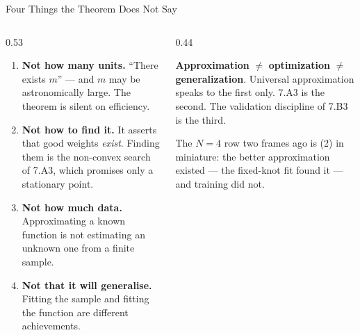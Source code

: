 \begin{frame}{Four Things the Theorem Does Not Say}
\begin{columns}[T]
\begin{column}{0.53\textwidth}
\small
\begin{enumerate}\small\setlength{\itemsep}{1.4mm}
  \item \textbf{Not how many units.} ``There exists $m$'' --- and $m$ may be astronomically large. The theorem is silent on efficiency.
  \item \textbf{Not how to find it.} It asserts that good weights \emph{exist}. Finding them is the non-convex search of 7.A3, which promises only a stationary point.
  \item \textbf{Not how much data.} Approximating a known function is not estimating an unknown one from a finite sample.
  \item \textbf{Not that it will generalise.} Fitting the sample and fitting the function are different achievements.
\end{enumerate}
\end{column}
\begin{column}{0.44\textwidth}
\begin{cautionbox}[title=\textbf{Keep these apart}]\small
\textbf{Approximation} $\neq$ \textbf{optimization} $\neq$ \textbf{generalization}.
\medskip
Universal approximation speaks to the first only. 7.A3 is the second. The validation discipline of 7.B3 is the third.
\end{cautionbox}
\medskip
\begin{examplebox}\footnotesize
The $N=4$ row two frames ago is (2) in miniature: the better approximation existed --- the fixed-knot fit found it --- and training did not.
\end{examplebox}
\end{column}
\end{columns}
\vspace{1mm}
\end{frame}

